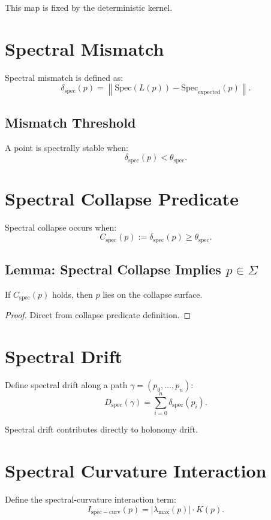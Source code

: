 \documentclass[11pt]{article}
\begin{document}
This map is fixed by the deterministic kernel.

\section{Spectral Mismatch}

Spectral mismatch is defined as:
\[
\delta_{\mathrm{spec}}(p)
  = \left\|
      \mathrm{Spec}(L(p))
      - \mathrm{Spec}_{\mathrm{expected}}(p)
    \right\|.
\]

\subsection{Mismatch Threshold}
A point is spectrally stable when:
\[
\delta_{\mathrm{spec}}(p) < \theta_{\mathrm{spec}}.
\]

\section{Spectral Collapse Predicate}

Spectral collapse occurs when:
\[
C_{\mathrm{spec}}(p)
  := \delta_{\mathrm{spec}}(p) \ge \theta_{\mathrm{spec}}.
\]

\subsection{Lemma: Spectral Collapse Implies $p \in \Sigma$}
If $C_{\mathrm{spec}}(p)$ holds, then $p$ lies on the collapse surface.

\begin{proof}
Direct from collapse predicate definition.
\end{proof}

\section{Spectral Drift}

Define spectral drift along a path $\gamma = (p_0, \ldots, p_n)$:
\[
D_{\mathrm{spec}}(\gamma)
  = \sum_{i=0}^{n}
      \delta_{\mathrm{spec}}(p_i).
\]

Spectral drift contributes directly to holonomy drift.

\section{Spectral Curvature Interaction}

Define the spectral-curvature interaction term:
\[
I_{\mathrm{spec-curv}}(p)
  = |\lambda_{\max}(p)| \cdot K(p).
\]
\end{document}
